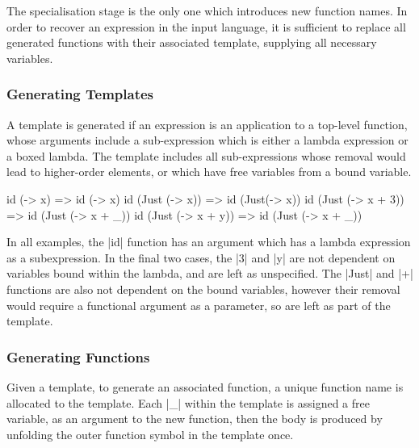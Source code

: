 \documentclass[preprint]{sigplanconf}
\begin{document}
The specialisation stage is the only one which introduces new function names. In order to recover an expression in the input language, it is sufficient to replace all generated functions with their associated template, supplying all necessary variables.

\subsubsection{Generating Templates}

A template is generated if an expression is an application to a top-level function, whose arguments include a sub-expression which is either a lambda expression or a boxed lambda. The template includes all sub-expressions whose removal would lead to higher-order elements, or which have free variables from a bound variable.

\begin{example}
\ignore\begin{code}
id (\x -> x)             => id (\x -> x)
id (Just (\x -> x))      => id (Just(\x -> x))
id (Just (\x -> x + 3))  => id (Just (\x -> x + _))
id (Just (\x -> x + y))  => id (Just (\x -> x + _))
\end{code}

In all examples, the |id| function has an argument which has a lambda expression as a subexpression. In the final two cases, the |3| and |y| are not dependent on variables bound within the lambda, and are left as unspecified.  The |Just| and |+| functions are also not dependent on the bound variables, however their removal would require a functional argument as a parameter, so are left as part of the template.
\end{example}

\subsubsection{Generating Functions}

Given a template, to generate an associated function, a unique function name is allocated to the template. Each |_| within the template is assigned a free variable, as an argument to the new function, then the body is produced by unfolding the outer function symbol in the template once.
\end{document}
